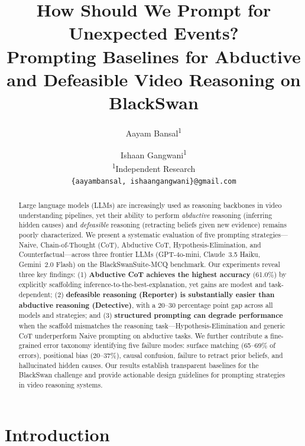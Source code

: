 \documentclass[10pt,twocolumn,letterpaper]{article}
\begin{document}
\title{How Should We Prompt for Unexpected Events?\\Prompting Baselines for Abductive and Defeasible Video Reasoning on BlackSwan}

\author{Aayam Bansal\textsuperscript{1} \and Ishaan Gangwani\textsuperscript{1}\\
\textsuperscript{1}Independent Research\\
{\tt\small \{aayambansal, ishaangangwani\}@gmail.com}}

\maketitle

\begin{abstract}
Large language models (LLMs) are increasingly used as reasoning backbones in video understanding pipelines, yet their ability to perform \textit{abductive} reasoning (inferring hidden causes) and \textit{defeasible} reasoning (retracting beliefs given new evidence) remains poorly characterized. We present a systematic evaluation of five prompting strategies---Naive, Chain-of-Thought (CoT), Abductive CoT, Hypothesis-Elimination, and Counterfactual---across three frontier LLMs (GPT-4o-mini, Claude~3.5 Haiku, Gemini~2.0 Flash) on the BlackSwanSuite-MCQ benchmark. Our experiments reveal three key findings: (1) \textbf{Abductive CoT achieves the highest accuracy} (61.0\%) by explicitly scaffolding inference-to-the-best-explanation, yet gains are modest and task-dependent; (2) \textbf{defeasible reasoning (Reporter) is substantially easier than abductive reasoning (Detective)}, with a 20--30 percentage point gap across all models and strategies; and (3) \textbf{structured prompting can degrade performance} when the scaffold mismatches the reasoning task---Hypothesis-Elimination and generic CoT underperform Naive prompting on abductive tasks. We further contribute a fine-grained error taxonomy identifying five failure modes: surface matching (65--69\% of errors), positional bias (20--37\%), causal confusion, failure to retract prior beliefs, and hallucinated hidden causes. Our results establish transparent baselines for the BlackSwan challenge and provide actionable design guidelines for prompting strategies in video reasoning systems.
\end{abstract}

\section{Introduction}
\label{sec:intro}
\end{document}
